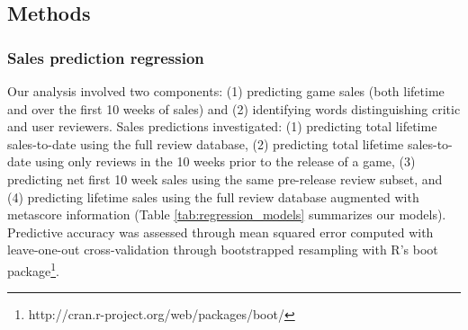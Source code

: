 \documentclass[letterpaper]{article}
\begin{document}
\subsection{Methods}
\subsubsection{Sales prediction regression}
Our analysis involved two components: (1) predicting game sales (both lifetime and over the first 10 weeks of sales) and (2) identifying words distinguishing critic and user reviewers. Sales predictions investigated: (1) predicting total lifetime sales-to-date using the full review database, (2) predicting total lifetime sales-to-date using only reviews in the 10 weeks prior to the release of a game, (3) predicting net first 10 week sales using the same pre-release review subset, and (4) predicting lifetime sales using the full review database augmented with metascore information (Table \ref{tab:regression_models} summarizes our models). Predictive accuracy was assessed through mean squared error computed with leave-one-out cross-validation through bootstrapped resampling with R's boot package\footnote{http://cran.r-project.org/web/packages/boot/}.
\end{document}

